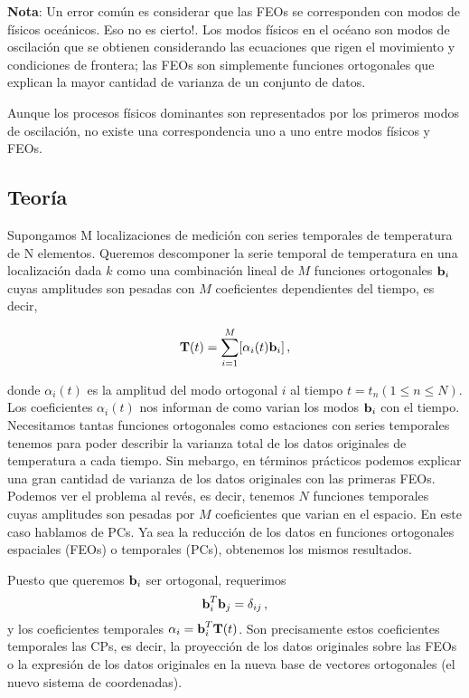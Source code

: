 \documentclass[
]{agujournal2019}
\begin{document}
\textbf{Nota}: Un error común es considerar que las FEOs se corresponden
con modos de físicos oceánicos. Eso no es cierto!. Los modos físicos en
el océano son modos de oscilación que se obtienen considerando las
ecuaciones que rigen el movimiento y condiciones de frontera; las FEOs
son simplemente funciones ortogonales que explican la mayor cantidad de
varianza de un conjunto de datos.

Aunque los procesos físicos dominantes son representados por los
primeros modos de oscilación, no existe una correspondencia uno a uno
entre modos físicos y FEOs.

\vspace{0.25cm}

\hypertarget{teoruxeda}{%
\subsection{Teoría}\label{teoruxeda}}

Supongamos M localizaciones de medición con series temporales de
temperatura de N elementos. Queremos descomponer la serie temporal de
temperatura en una localización dada \(k\) como una combinación lineal
de \(M\) funciones ortogonales \({\textbf b}_i\) cuyas amplitudes son
pesadas con \(M\) coeficientes dependientes del tiempo, es decir,

\[{\textbf T}(t)=\sum\limits^M_{i=1}[\alpha_i(t){\textbf b}_{i}]\,,\]

donde \(\alpha_i(t)\) es la amplitud del modo ortogonal \(i\) al tiempo
\(t=t_n(1\le n\le N)\). Los coeficientes \(\alpha_i(t)\) nos informan de
como varian los modos \({\textbf b}_{i}\) con el tiempo. Necesitamos
tantas funciones ortogonales como estaciones con series temporales
tenemos para poder describir la varianza total de los datos originales
de temperatura a cada tiempo. Sin mebargo, en términos prácticos podemos
explicar una gran cantidad de varianza de los datos originales con las
primeras FEOs. Podemos ver el problema al revés, es decir, tenemos \(N\)
funciones temporales cuyas amplitudes son pesadas por \(M\) coeficientes
que varian en el espacio. En este caso hablamos de PCs. Ya sea la
reducción de los datos en funciones ortogonales espaciales (FEOs) o
temporales (PCs), obtenemos los mismos resultados.

Puesto que queremos \({\textbf b}_{i}\) ser ortogonal, requerimos
\[{\textbf b}^T_i {\textbf b}_{j}=\delta_{ij}\,,\] y los coeficientes
temporales \(\alpha_i={\textbf b}^T_{i}{\textbf T}(t)\). Son
precisamente estos coeficientes temporales las CPs, es decir, la
proyección de los datos originales sobre las FEOs o la expresión de los
datos originales en la nueva base de vectores ortogonales (el nuevo
sistema de coordenadas).
\end{document}

